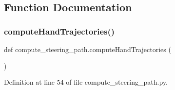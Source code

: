 \subsection{Function Documentation}
\mbox{\label{namespacecompute__steering__path_a7b5761807cb6896d26a326000e13efdc}} 
\subsubsection{\texorpdfstring{computeHandTrajectories()}{computeHandTrajectories()}}
{\footnotesize\ttfamily def compute\+\_\+steering\+\_\+path.\+compute\+Hand\+Trajectories (\begin{DoxyParamCaption}{ }\end{DoxyParamCaption})}



Definition at line 54 of file compute\+\_\+steering\+\_\+path.\+py.


